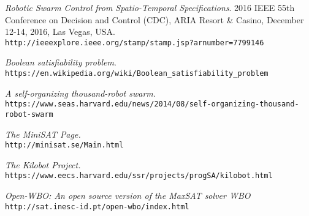 \documentclass{article}[11pt]
\begin{document}
		\begin{thebibliography}{9}
			\author{Iman Haghighi, Sadra Sadraddini, and Calin Belta.}
			\textit{Robotic  Swarm  Control  from  Spatio-Temporal  Specifications}.
			2016 IEEE 55th Conference on Decision and Control (CDC), ARIA Resort \& Casino, December 12-14, 2016, Las Vegas, USA.\\
			\texttt{http://ieeexplore.ieee.org/stamp/stamp.jsp?arnumber=7799146} 			
			
			\author{Wikipedia}
			\textit{Boolean satisfiability problem}. \\
			\texttt{https://en.wikipedia.org/wiki/Boolean\_satisfiability\_problem} 
			
			\author{Caroline Perry.}
			\textit{A self-organizing thousand-robot swarm.}\\
			\texttt{https://www.seas.harvard.edu/news/2014/08/self-organizing-thousand-robot-swarm}
			
			\author{Niklas EÃ©n, Niklas SÃ¶rensson}
			\textit{The MiniSAT Page.}\\
			\texttt{http://minisat.se/Main.html}

			\author{Self Organizing Systems Research Group.}
			\textit{The Kilobot Project.}\\
			\texttt{https://www.eecs.harvard.edu/ssr/projects/progSA/kilobot.html}

			\author{Ruben Martins, Vasco Manquinho, Inês Lynce.}
			\textit{Open-WBO: An open source version of the MaxSAT solver WBO}\\
			\texttt{http://sat.inesc-id.pt/open-wbo/index.html}
		\end{thebibliography}
\end{document}
